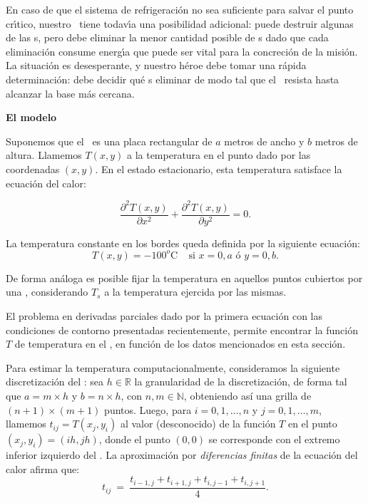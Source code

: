\documentclass[spanish,a4paper]{article}
\begin{document}
En caso de que el sistema de refrigeraci\'on no sea suficiente para salvar
el punto cr\'\i tico, nues\-tro \capitan\ tiene todav\'\i a una posibilidad
adicional: puede des\-tru\-ir algunas de las \atacante s, pero debe eliminar la
menor cantidad posible de \atacante s dado que cada eliminaci\'on consume
energ\'\i a que puede ser vital para la concreci\'on de la misi\'on.
La situaci\'on es desesperante, y nuestro h\'eroe debe tomar una r\'apida
determinaci\'on: debe decidir qu\'e \atacante s eliminar de modo tal que el
\objeto\ resista hasta alcanzar la base m\'as cercana.

{\noindent \bf El modelo}

Suponemos que el \objeto\ es una placa rectangular de $a$ metros de ancho y $b$ metros de altura. Llamemos $T(x,y)$ a la temperatura en el punto dado por las coordenadas $(x,y)$. En el estado estacionario, esta temperatura satisface la ecuaci\'on del calor:

\begin{equation}\label{eq:calor}
\frac{\partial^2T(x,y)}{\partial x^{2}}+\frac{\partial^2 T(x,y)}{\partial y^{2}} = 0.
\end{equation}

\noindent La temperatura constante en los bordes queda definida por la siguiente ecuaci\'on:
\begin{equation}
T(x,y) = -100^o\textrm{C}~~~~~\textrm{si } x = 0,a \textrm{ \'o } y = 0,b.
\label{eq:borde}
\end{equation}

\noindent De forma an\'aloga es posible fijar la temperatura en aquellos puntos cubiertos por una \atacante, considerando $T_s$ a la temperatura ejercida por las mismas.

El problema en derivadas parciales dado por la primera ecuaci\'on con las condiciones de contorno presentadas recientemente, permite encontrar la funci\'on $T$ de temperatura en el \objeto, en funci\'on de los datos mencionados en esta secci\'on.

Para estimar la temperatura computacionalmente, con\-si\-de\-ra\-mos la siguiente discretizaci\'on del \objeto: sea $h \in \mathbb{R}$ la granularidad de la discretizaci\'on, de forma tal que $a = m\times h$ y $b = n \times h$, con $n,m \in \mathbb{N}$, obteniendo as\'i una grilla de $(n+1)\times(m+1)$ puntos. Luego, para $i=0,1,\dots,n$ y $j=0,1,\dots,m$, llamemos $t_{ij} = T(x_j,y_i)$ al valor (desconocido) de la funci\'on $T$ en el punto $(x_j, y_i) = (ih, jh)$, donde el punto $(0,0)$ se corresponde con el extremo inferior izquierdo del \objeto.
La aproximaci\'on por \emph{diferencias finitas} de la ecuaci\'on del calor afirma que:
\begin{equation}
t_{ij} \ =\ \frac{ t_{i-1,j} + t_{i+1,j} + t_{i,j-1} + t_{i,j+1}}{4}.\label{eq:calordd}
\end{equation}
\end{document}
